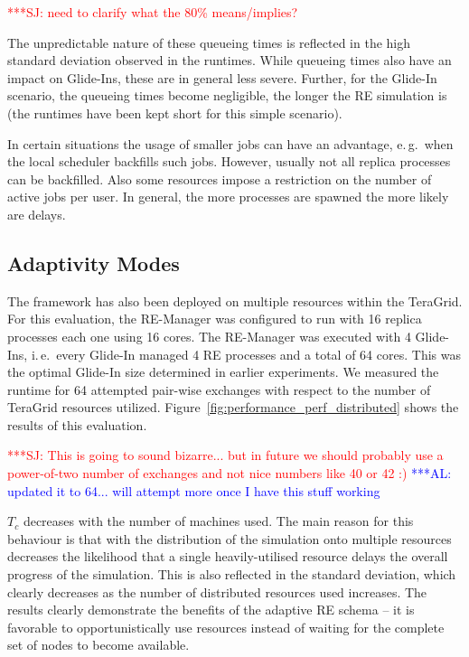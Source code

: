 \documentclass{rspublic}
\newcommand{\alnote}[1]{ {\textcolor{blue} { ***AL: #1 }}}
\newcommand{\jhanote}[1]{ {\textcolor{red} { ***SJ: #1 }}}
\newcommand{\alnote}[1]{}
\newcommand{\jhanote}[1]{}
\begin{document}
{\jhanote{need to clarify what the 80\% means/implies?}

The unpredictable nature of these queueing times is reflected in the
high standard deviation observed in the runtimes. While queueing times
also have an impact on Glide-Ins, these are in general less severe.
Further, for the Glide-In scenario, the queueing times become
negligible, the longer the RE simulation is (the runtimes have been
kept short for this simple scenario). 
                                                           
In certain situations the usage of smaller jobs can have an advantage,
e.\,g.\ when the local scheduler backfills such jobs. However, usually
not all replica processes can be backfilled. Also some resources
impose a restriction on the number of active jobs per user.  In
general, the more processes are spawned the more likely are delays.   

\subsection{Adaptivity Modes}

The framework has also been deployed on multiple resources within the
TeraGrid.  For this evaluation, the RE-Manager was configured to run
with 16 replica processes each one using 16 cores.  The RE-Manager was
executed with 4 Glide-Ins, i.\,e.\ every Glide-In managed 4 RE
processes and a total of 64 cores.  This was the optimal Glide-In size
determined in earlier experiments.  
We measured the runtime for 64 attempted pair-wise exchanges 
with respect to the number of TeraGrid
resources utilized. Figure~\ref{fig:performance_perf_distributed}
shows the results of this evaluation.

\jhanote{This is going to sound bizarre... but in future we should
  probably use a power-of-two number of exchanges and not nice numbers
  like 40 or 42 :)}           
\alnote{updated it to 64... will attempt more once I have this stuff working}


$T_{c}$ decreases with the number of machines
used. The main reason for this behaviour is that with the distribution
of the simulation onto multiple resources decreases the likelihood
that a single heavily-utilised resource delays the overall progress of
the simulation. This is also reflected in the standard deviation,
which clearly decreases as the number of distributed resources used
increases. The results clearly demonstrate the benefits of the
adaptive RE schema -- it is favorable to opportunistically use
resources instead of waiting for the complete set of nodes to become
available.

}
\end{document}
